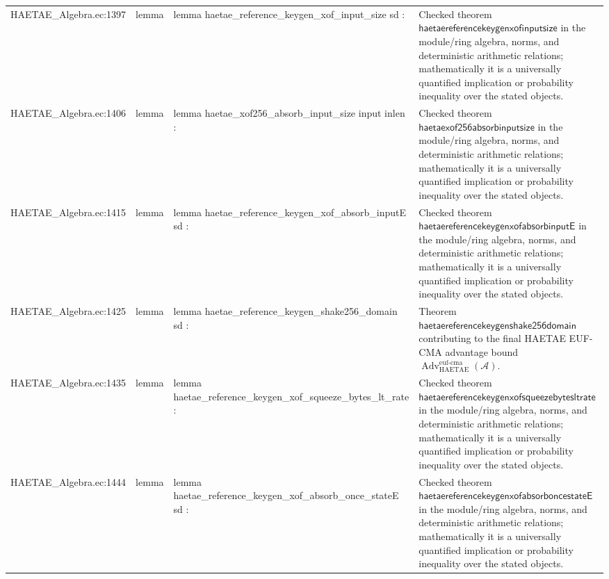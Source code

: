 \documentclass[10pt]{article}
\newcommand{\Adv}{\operatorname{Adv}}
\begin{document}
\begin{longtable}{L{0.11\textwidth}L{0.055\textwidth}L{0.385\textwidth}L{0.41\textwidth}}
HAETAE\_\allowbreak{}Algebra.\allowbreak{}ec:\allowbreak{}1397 & lemma & {\ttfamily\scriptsize lemma haetae\_\allowbreak{}reference\_\allowbreak{}keygen\_\allowbreak{}xof\_\allowbreak{}input\_\allowbreak{}size sd :} & Checked theorem $\mathsf{haetaereferencekeygenxofinputsize}$ in the module/ring algebra, norms, and deterministic arithmetic relations; mathematically it is a universally quantified implication or probability inequality over the stated objects. \\
HAETAE\_\allowbreak{}Algebra.\allowbreak{}ec:\allowbreak{}1406 & lemma & {\ttfamily\scriptsize lemma haetae\_\allowbreak{}xof256\_\allowbreak{}absorb\_\allowbreak{}input\_\allowbreak{}size input inlen :} & Checked theorem $\mathsf{haetaexof256absorbinputsize}$ in the module/ring algebra, norms, and deterministic arithmetic relations; mathematically it is a universally quantified implication or probability inequality over the stated objects. \\
HAETAE\_\allowbreak{}Algebra.\allowbreak{}ec:\allowbreak{}1415 & lemma & {\ttfamily\scriptsize lemma haetae\_\allowbreak{}reference\_\allowbreak{}keygen\_\allowbreak{}xof\_\allowbreak{}absorb\_\allowbreak{}inputE sd :} & Checked theorem $\mathsf{haetaereferencekeygenxofabsorbinputE}$ in the module/ring algebra, norms, and deterministic arithmetic relations; mathematically it is a universally quantified implication or probability inequality over the stated objects. \\
HAETAE\_\allowbreak{}Algebra.\allowbreak{}ec:\allowbreak{}1425 & lemma & {\ttfamily\scriptsize lemma haetae\_\allowbreak{}reference\_\allowbreak{}keygen\_\allowbreak{}shake256\_\allowbreak{}domain sd :} & Theorem $\mathsf{haetaereferencekeygenshake256domain}$ contributing to the final HAETAE EUF-CMA advantage bound $\Adv_{\mathrm{HAETAE}}^{\mathrm{euf\mbox{-}cma}}(\mathcal A)$. \\
HAETAE\_\allowbreak{}Algebra.\allowbreak{}ec:\allowbreak{}1435 & lemma & {\ttfamily\scriptsize lemma haetae\_\allowbreak{}reference\_\allowbreak{}keygen\_\allowbreak{}xof\_\allowbreak{}squeeze\_\allowbreak{}bytes\_\allowbreak{}lt\_\allowbreak{}rate :} & Checked theorem $\mathsf{haetaereferencekeygenxofsqueezebytesltrate}$ in the module/ring algebra, norms, and deterministic arithmetic relations; mathematically it is a universally quantified implication or probability inequality over the stated objects. \\
HAETAE\_\allowbreak{}Algebra.\allowbreak{}ec:\allowbreak{}1444 & lemma & {\ttfamily\scriptsize lemma haetae\_\allowbreak{}reference\_\allowbreak{}keygen\_\allowbreak{}xof\_\allowbreak{}absorb\_\allowbreak{}once\_\allowbreak{}stateE sd :} & Checked theorem $\mathsf{haetaereferencekeygenxofabsorboncestateE}$ in the module/ring algebra, norms, and deterministic arithmetic relations; mathematically it is a universally quantified implication or probability inequality over the stated objects. \\

\end{longtable}
\end{document}
